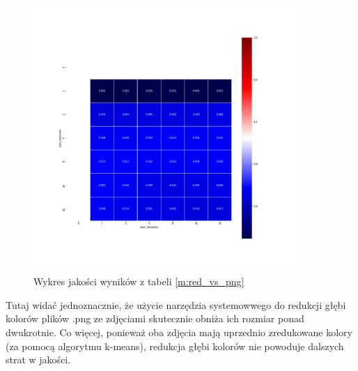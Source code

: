\begin{figure}[H]
	\includegraphics[width=0.9\textwidth]{photos/plots/red_vs_png}
    \caption{Wykres jakości wyników z tabeli \ref{m:red_vs_png}}
\end{figure}

Tutaj widać jednoznacznie, że użycie narzędzia systemowwego do redukcji głębi kolorów plików .png ze zdjęciami skutecznie obniża ich rozmiar ponad dwukrotnie. Co więcej, ponieważ oba zdjęcia mają uprzednio zredukowane kolory (za pomocą algorytmu k-means), redukcja głębi kolorów nie powoduje dalszych strat w jakości.

